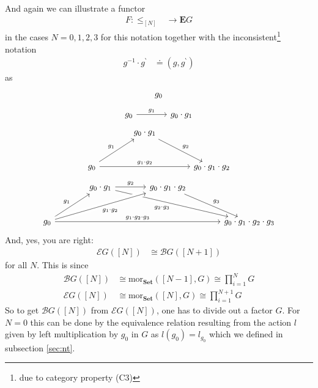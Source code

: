 And again we can illustrate a functor
\begin{align*}
  F
  \colon
  \pmb{\leq}_{[N]}
  &\rightarrow
  \mathbf{E}G
\end{align*}
in the cases $N = 0,1,2,3$ for this notation together with the inconsistent\footnote{due to category property (C3)} notation
\begin{align*}
  g^{-1}
  \cdot
  g^{\backprime}
  &\doteq
  \left(
    g,
    g^{\backprime}
  \right)
\end{align*}
as
\[
\begin{tikzcd}[sep=large]
  g_{0}
\end{tikzcd}
\]
\[
\begin{tikzcd}[sep=large]
  g_{0}
  \arrow{r}{g_{1}}
  &
  g_{0}
  \cdot
  g_{1}
\end{tikzcd}
\]
\[
\begin{tikzcd}[sep=large]
  &
  g_{0}
  \cdot
  g_{1}
  \arrow{rd}{g_{2}}
  &
  \\
  g_{0}
  \arrow{ru}{g_{1}}
  \arrow{rr}{g_{1} \cdot g_{2}}
  &
  &
  g_{0}
  \cdot
  g_{1}
  \cdot
  g_{2}
\end{tikzcd}
\]
\[
\begin{tikzcd}[sep=large]
  &
  g_{0}
  \cdot
  g_{1}
  \arrow{r}{g_{2}}
  \arrow[swap,crossing over]{rrd}{g_{2} \cdot g_{3}}
  &
  g_{0}
  \cdot
  g_{1}
  \cdot
  g_{2}
  \arrow{rd}{g_{3}}
  &
  \\
  g_{0}
  \arrow{ru}{g_{1}}
  \arrow[swap,crossing over]{rru}{g_{1} \cdot g_{2}}
  \arrow{rrr}{g_{1} \cdot g_{2} \cdot g_{3}}
  &
  &
  &
  g_{0}
  \cdot
  g_{1}
  \cdot
  g_{2}
  \cdot
  g_{3}
\end{tikzcd}
\]
And, yes, you are right:
\begin{align*}
  \mathcal{E}G
  \left(
    [N]
  \right)
  &\cong
  \mathcal{B}G
  \left(
    [N + 1]
  \right)
\end{align*}
for all $N$.
This is since
\begin{align*}
  \mathcal{B}G
  \left(
    [N]
  \right)
  &\cong
  \mathrm{mor}_{\mathbf{Set}}([N - 1],G)
  \cong
  \prod_{i=1}^{N}
  G
  \\
  \mathcal{E}G
  \left(
    [N]
  \right)
  &\cong
  \mathrm{mor}_{\mathbf{Set}}([N],G)
  \cong
  \prod_{i=1}^{N+1}
  G
\end{align*}
So to get $\mathcal{B}G([N])$ from $\mathcal{E}G([N])$, one has to divide out a factor $G$.
For $N = 0$ this can be done by the equivalence relation resulting from the action $l$ given by left multiplication by $g_{0}$ in $G$ as $l(g_{0}) = l_{g_{0}}$ which we defined in subsection \ref{sec:nt}.
